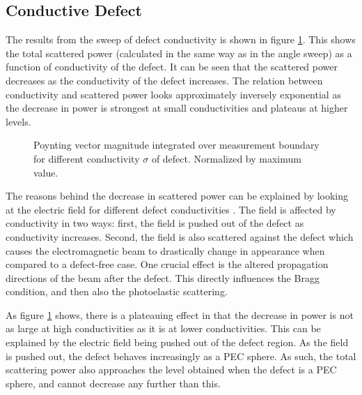 \documentclass[11pt,twoside]{eitExjobb}
\begin{document}
	\subsection{Conductive Defect}
	The results from the sweep of defect conductivity is shown in figure \ref{fig:res-cond-power}. This shows the total scattered power (calculated in the same way as in the angle sweep) as a function of conductivity of the defect. It can be seen that the scattered power decreases as the conductivity of the defect increases. The relation between conductivity and scattered power looks approximately inversely exponential as the decrease in power is strongest at small conductivities and plateaus at higher levels.
	
	\begin{figure}[h]
		\centering
		\resizebox{\textwidth}{!}{
			
		}
		\caption{\label{fig:res-cond-power} Poynting vector magnitude integrated over measurement boundary for different conductivity $\sigma$ of defect. Normalized by maximum value.}
	\end{figure}
	
	The reasons behind the decrease in scattered power can be explained by looking at the electric field for different defect conductivities . The field is affected by conductivity in two ways: first, the field is pushed out of the defect as conductivity increases. Second, the field is also scattered against the defect which causes the electromagnetic beam to drastically change in appearance when compared to a defect-free case. One crucial effect is the altered propagation directions of the beam after the defect. This directly influences the Bragg condition, and then also the photoelastic scattering.
	
	As figure \ref{fig:res-cond-power} shows, there is a plateauing effect in that the decrease in power is not as large at high conductivities as it is at lower conductivities. This can be explained by the electric field being pushed out of the defect region. As the field is pushed out, the defect behaves increasingly as a PEC sphere. As such, the total scattering power also approaches the level obtained when the defect is a PEC sphere, and cannot decrease any further than this. 
	
	
\end{document}
